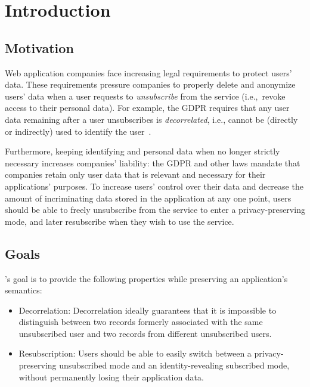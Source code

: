 \section{Introduction}

\subsection{Motivation} 

Web application companies face increasing legal requirements to protect users’ data. These
requirements pressure companies to properly delete and anonymize users' data when a user requests to
\emph{unsubscribe} from the service (i.e.,\ revoke access to their personal data).
For example, the GDPR requires that any user data remaining after a user unsubscribes is
\emph{decorrelated}, i.e., cannot be (directly or indirectly) used to identify the user~\cite{gdpr}.  

Furthermore, keeping identifying and personal data when no longer strictly necessary increases
companies' liability: the GDPR and other laws mandate that companies retain only user data that is
relevant and necessary for their applications' purposes. To increase users' control over their data
and decrease the amount of incriminating data stored in the application at any one point, users
should be able to freely unsubscribe from the service to enter a privacy-preserving mode, and later
resubscribe when they wish to use the service. 

\subsection{Goals} 
\sys's goal is to provide the following properties while preserving an application's 
semantics: 
\begin{itemize} 
    \item Decorrelation: Decorrelation ideally guarantees that it is impossible to distinguish
        between two records formerly associated with the same unsubscribed user and two records from
        different unsubscribed users.  
    \item Resubscription: Users should be able to easily switch between a privacy-preserving unsubscribed mode 
       and an identity-revealing subscribed mode, without permanently losing their application data.  
\end{itemize}

